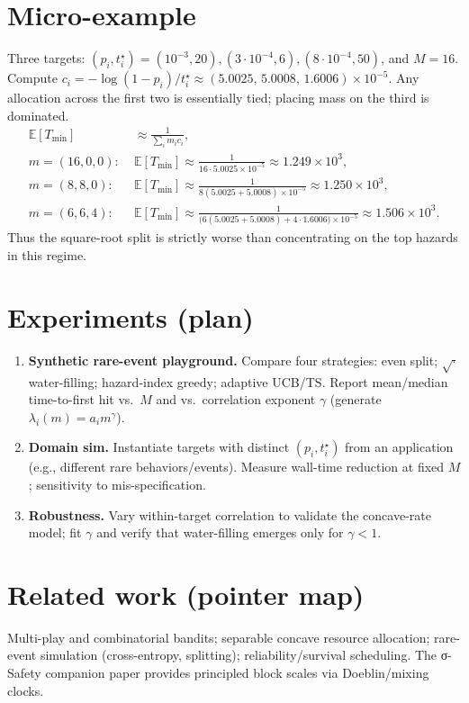 \documentclass[11pt]{article}
\newcommand{\E}{\mathbb{E}}
\newcommand{\1}{\mathbf{1}}
\begin{document}
\section{Micro-example}
Three targets: $(p_i,t_i^\star)=(10^{-3},20),(3\cdot10^{-4},6),(8\cdot10^{-4},50)$, and $M=16$. Compute $c_i = -\log(1-p_i)/t_i^\star \approx (5.0025,\,5.0008,\,1.6006)\times 10^{-5}$. Any allocation across the first two is essentially tied; placing mass on the third is dominated.
\begin{align*}
\E[T_{\min}] &\approx \frac{1}{\sum_i m_i c_i},\\
m=(16,0,0):\; &\E[T_{\min}]\approx \frac{1}{16\cdot 5.0025\times 10^{-5}}\approx 1.249\times 10^3,\\
m=(8,8,0):\; &\E[T_{\min}]\approx \frac{1}{8(5.0025+5.0008)\times 10^{-5}}\approx 1.250\times 10^3,\\
m=(6,6,4):\; &\E[T_{\min}]\approx \frac{1}{\big(6(5.0025+5.0008)+4\cdot 1.6006\big)\times 10^{-5}}\approx 1.506\times 10^3.
\end{align*}
Thus the square-root split is strictly worse than concentrating on the top hazards in this regime.

\section{Experiments (plan)}
\begin{enumerate}[leftmargin=*, itemsep=2pt]
\item \textbf{Synthetic rare-event playground.} Compare four strategies: even split; $\sqrt{\cdot}$ water-filling; hazard-index greedy; adaptive UCB/TS. Report mean/median time-to-first hit vs.\ $M$ and vs.\ correlation exponent $\gamma$ (generate $\lambda_i(m)=a_i m^\gamma$).
\item \textbf{Domain sim.} Instantiate targets with distinct $(p_i,t_i^\star)$ from an application (e.g., different rare behaviors/events). Measure wall-time reduction at fixed $M$; sensitivity to mis-specification.
\item \textbf{Robustness.} Vary within-target correlation to validate the concave-rate model; fit $\gamma$ and verify that water-filling emerges only for $\gamma<1$.
\end{enumerate}

\section{Related work (pointer map)}
Multi-play and combinatorial bandits\cite{Anantharam1987,Auer2002,GarivierCappe2011,AgrawalGoyal2012}; separable concave resource allocation\cite{IbarakiKatoh1988,BoydVandenberghe2004}; rare-event simulation (cross-entropy, splitting)\cite{RubinsteinKroese2004,GlassermanHeidelbergerShahabuddin1999}; reliability/survival scheduling\cite{Ross2014}. The σ-Safety companion paper provides principled block scales via Doeblin/mixing clocks\cite{MeynTweedie2009}.
\end{document}

